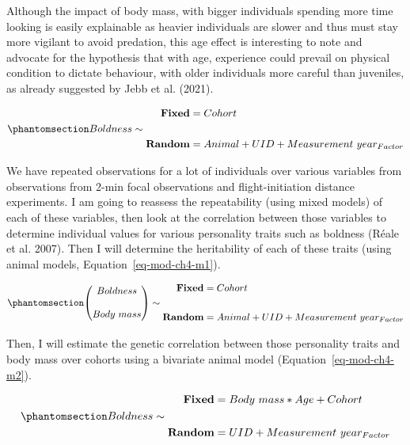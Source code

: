 \documentclass[
  12pt,
  letterpaper,
]{scrartcl}
\begin{document}
Although the impact of body mass, with bigger individuals spending more
time looking is easily explainable as heavier individuals are slower and
thus must stay more vigilant to avoid predation, this age effect is
interesting to note and advocate for the hypothesis that with age,
experience could prevail on physical condition to dictate behaviour,
with older individuals more careful than juveniles, as already suggested
by Jebb et al. (2021).

\begin{equation}\phantomsection\label{eq-mod-ch4-m1}{
Boldness
\sim
\begin{aligned}
\textbf{Fixed} &= Cohort \\
\\
\textbf{Random} &= Animal + UID + Measurement\ year_{Factor}
\end{aligned}
}\end{equation}

We have repeated observations for a lot of individuals over various
variables from observations from 2-min focal observations and
flight-initiation distance experiments. I am going to reassess the
repeatability (using mixed models) of each of these variables, then look
at the correlation between those variables to determine individual
values for various personality traits such as boldness (Réale et al.
2007). Then I will determine the heritability of each of these traits
(using animal models, Equation~\ref{eq-mod-ch4-m1}).

\begin{equation}\phantomsection\label{eq-mod-ch4-m2}{
\begin{pmatrix}
Boldness \\
\\
Body\ mass
\end{pmatrix}
\sim
\begin{aligned}
\textbf{Fixed} &= Cohort \\
\\
\textbf{Random} &= Animal + UID + Measurement\ year_{Factor}
\end{aligned}
}\end{equation}

Then, I will estimate the genetic correlation between those personality
traits and body mass over cohorts using a bivariate animal model
(Equation~\ref{eq-mod-ch4-m2}).

\begin{equation}\phantomsection\label{eq-mod-ch4-m3}{
Boldness
\sim
\begin{aligned}
\textbf{Fixed} &= Body\ mass * Age + Cohort \\
\\
\textbf{Random} &= UID + Measurement\ year_{Factor}
\end{aligned}
}\end{equation}
\end{document}
